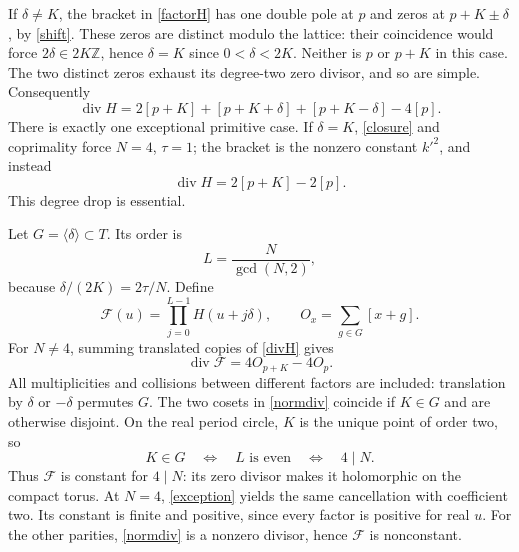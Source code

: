 \documentclass[11pt]{article}
\newcommand{\Div}{\operatorname{div}}
\begin{document}
If $\delta\ne K$, the bracket in \eqref{factorH} has one double pole
at $p$ and zeros at $p+K\pm\delta$, by \eqref{shift}.
These zeros are distinct modulo the lattice: their coincidence would
force $2\delta\in2K\mathbb Z$, hence $\delta=K$ since
$0<\delta<2K$. Neither is $p$ or $p+K$ in this case.
The two distinct zeros exhaust its degree-two zero divisor, and so are
simple. Consequently
\begin{equation}\label{divH}
 \Div H=2[p+K]+[p+K+\delta]+[p+K-\delta]-4[p].
\end{equation}
There is exactly one exceptional primitive case. If $\delta=K$,
\eqref{closure} and coprimality force $N=4$, $\tau=1$; the bracket
is the nonzero constant $k'^2$, and instead
\begin{equation}\label{exception}
 \Div H=2[p+K]-2[p].
\end{equation}
This degree drop is essential.

Let $G=\langle\delta\rangle\subset T$. Its order is
\[
 L=\frac N{\gcd(N,2)},
\]
because $\delta/(2K)=2\tau/N$. Define
\[
 \mathcal F(u)=\prod_{j=0}^{L-1}H(u+j\delta),\qquad
 O_x=\sum_{g\in G}[x+g].
\]
For $N\ne4$, summing translated copies of \eqref{divH} gives
\begin{equation}\label{normdiv}
 \Div\mathcal F=4O_{p+K}-4O_p.
\end{equation}
All multiplicities and collisions between different factors are included:
translation by $\delta$ or $-\delta$ permutes $G$.
The two cosets in \eqref{normdiv} coincide if $K\in G$ and are
otherwise disjoint. On the real period circle, $K$ is the unique point
of order two, so
\begin{equation}\label{parity}
 K\in G\quad\Longleftrightarrow\quad L\text{ is even}
 \quad\Longleftrightarrow\quad4\mid N.
\end{equation}
Thus $\mathcal F$ is constant for $4\mid N$: its zero divisor makes it
holomorphic on the compact torus. At $N=4$, \eqref{exception} yields
the same cancellation with coefficient two. Its constant is finite and
positive, since every factor is positive for real $u$.
For the other parities, \eqref{normdiv} is a nonzero divisor, hence
$\mathcal F$ is nonconstant.
\end{document}

